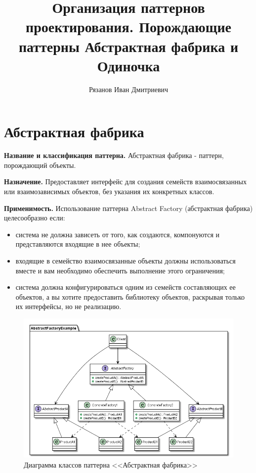 \documentclass[PI,LAB]{HSEUniversity}
\title{Организация паттернов проектирования. Порождающие паттерны Абстрактная фабрика и Одиночка}
\author{Рязанов Иван Дмитриевич}
\begin{document}
\maketitle
\chapter{Абстрактная фабрика}
\textbf{Название и классификация паттерна.}
Абстрактная фабрика - паттерн, порождающий объекты.

\textbf{Назначение.}
Предоставляет интерфейс для создания семейств взаимосвязанных или взаимозависимых объектов, без указания их конкретных классов.

\textbf{Применимость.}
Использование паттерна Abstract Factory (абстрактная фабрика) целесообразно если:
\begin{itemize}
  \item система не должна зависеть от того, как создаются, компонуются и представляются входящие в нее объекты;
  \item входящие в семейство взаимосвязанные объекты должны использоваться вместе и вам необходимо обеспечить выполнение этого ограничения;
  \item система должна конфигурироваться одним из семейств составляющих ее объектов, а вы хотите предоставить библиотеку объектов, раскрывая только их интерфейсы, но не реализацию.
\end{itemize}
\clearpage

\begin{figure}[p]
  \centering
  \includegraphics[scale=0.6]{AF_CD.png}
  \caption{Диаграмма классов паттерна <<Абстрактная фабрика>>}
\end{figure}
\end{document}
